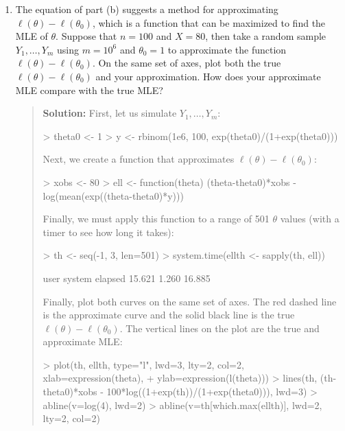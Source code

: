 \documentclass{article}
\begin{document}
\begin{enumerate}
\begin{enumerate}
      \item The equation of part (b) suggests a method for approximating
      $\ell(\theta)-\ell(\theta_0)$, which is a function that can be maximized
      to find the MLE of $\theta$. Suppose that $n=100$ and $X=80$, then take a
      random sample $Y_1, \ldots, Y_m$ using $m=10^6$ and $\theta_0=1$ to
      approximate the function $\ell(\theta)-\ell(\theta_0)$. On the same set of
      axes, plot both the true $\ell(\theta)-\ell(\theta_0)$ and your
      approximation. How does your approximate MLE compare with the true MLE?
      \begin{quotation}{\bf Solution:}
      First, let us simulate $Y_1, \ldots, Y_m$:
\begin{Schunk}
\begin{Sinput}
> theta0 <- 1
> y <- rbinom(1e6, 100, exp(theta0)/(1+exp(theta0)))
\end{Sinput}
\end{Schunk}
      Next, we create a function that approximates $\ell(\theta)-\ell(\theta_0)$:
\begin{Schunk}
\begin{Sinput}
> xobs <- 80
> ell <- function(theta) (theta-theta0)*xobs - log(mean(exp((theta-theta0)*y)))
\end{Sinput}
\end{Schunk}
      Finally, we must apply this function to a range of 501 $\theta$ values (with a timer 
      to see how long it takes):
\begin{Schunk}
\begin{Sinput}
> th <- seq(-1, 3, len=501)
> system.time(ellth <- sapply(th, ell))
\end{Sinput}
\begin{Soutput}
   user  system elapsed 
 15.621   1.260  16.885 
\end{Soutput}
\end{Schunk}
      Finally, plot both curves on the same set of axes.  The red dashed line is the
      approximate curve and the solid black line is the true $\ell(\theta)-\ell(\theta_0)$.
      The vertical lines on the plot are the true and approximate MLE:
\begin{Schunk}
\begin{Sinput}
> plot(th, ellth, type="l", lwd=3, lty=2, col=2, xlab=expression(theta),
+     ylab=expression(l(theta)))
> lines(th, (th-theta0)*xobs - 100*log((1+exp(th))/(1+exp(theta0))), lwd=3)
> abline(v=log(4), lwd=2)
> abline(v=th[which.max(ellth)], lwd=2, lty=2, col=2)
\end{Sinput}

\end{Schunk}
\end{quotation}
\end{enumerate}
\end{enumerate}
\end{document}
